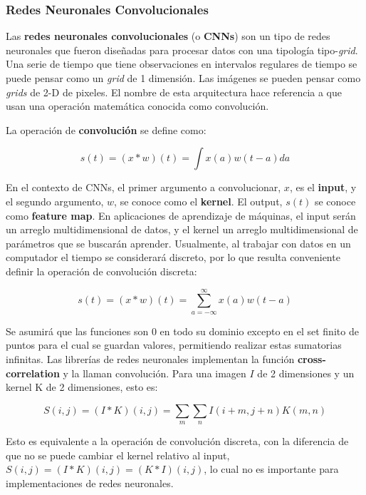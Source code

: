 \subsubsection{Redes Neuronales Convolucionales}

Las \textbf{redes neuronales convolucionales} (o \textbf{CNNs}) son un tipo de redes neuronales que fueron dise{\~{n}}adas para procesar datos con una tipolog\'ia tipo-\textit{grid}. Una serie de tiempo que tiene observaciones en intervalos regulares de tiempo se puede pensar como un \textit{grid} de 1 dimensi\'on. Las im\'agenes se pueden pensar como \textit{grids} de 2-D de pixeles. El nombre de esta arquitectura hace referencia a que usan una operaci\'on matem\'atica conocida como convoluci\'on.

La operaci\'on de \textbf{convoluci\'on} se define como:

\begin{equation}
s(t) = (x * w)(t) = \int x(a)w(t-a)da
\end{equation}

En el contexto de CNNs, el primer argumento a convolucionar, $x$, es el \textbf{input}, y el segundo argumento, $w$, se conoce como el \textbf{kernel}. El output, $s(t)$ se conoce como \textbf{feature map}. En aplicaciones de aprendizaje de m\'aquinas, el input ser\'an un arreglo multidimensional de datos, y el kernel un arreglo multidimensional de par\'ametros que se buscar\'an aprender. Usualmente, al trabajar con datos en un computador el tiempo se considerar\'a discreto, por lo que resulta conveniente definir la operaci\'on de convoluci\'on discreta:

\begin{equation}
s(t) = (x * w)(t) = \sum_{a=-\infty}^{\infty} x(a)w(t-a)
\end{equation}

Se asumir\'a que las funciones son 0 en todo su dominio excepto en el set finito de puntos para el cual se guardan valores, permitiendo realizar estas sumatorias infinitas. Las librer\'ias de redes neuronales implementan la funci\'on \textbf{cross-correlation} y la llaman convoluci\'on. Para una imagen $I$ de 2 dimensiones y un kernel K de 2 dimensiones, esto es: 

\begin{equation}
S(i,j) = (I * K)(i,j) = \sum_{m}\sum_{n} I(i+m,j+n)K(m,n)
\end{equation}

Esto es equivalente a la operaci\'on de convoluci\'on discreta, con la diferencia de que no se puede cambiar el kernel relativo al input, $S(i,j) = (I * K)(i,j) = (K * I)(i,j)$, lo cual no es importante para implementaciones de redes neuronales. 

